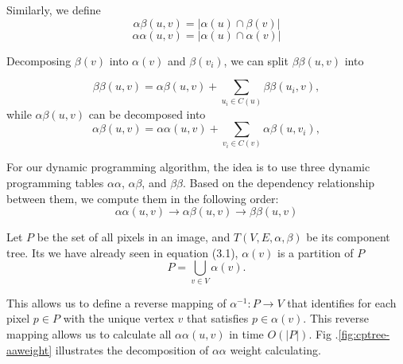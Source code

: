 Similarly, we define 
\begin{equation*} \label{eqn:alphabeta}
\alpha\beta(u,v) = |\alpha(u) \cap \beta(v)|  
\end{equation*}
\begin{equation*} \label{eqn:alphaalpha}
\alpha\alpha(u,v) = |\alpha(u)\cap\alpha(v)|
\end{equation*}

Decomposing $\beta(v)$ into $\alpha(v)$ and $\beta(v_i)$, we can split $\beta\beta(u,v)$ into

\begin{equation*} \label{eqn:betabeta-comp}
\beta\beta(u,v) = \alpha\beta(u,v) + \sum_{u_i \in C(u)}\beta\beta(u_i,v),
\end{equation*}
while $\alpha\beta(u,v)$ can be decomposed into
\begin{equation*} \label{eqn:alphabeta-comp}
\alpha\beta(u,v) = \alpha\alpha(u,v) + \sum_{v_i \in C(v)}\alpha\beta(u,v_i),
\end{equation*}

For our dynamic programming algorithm, the idea is to use three dynamic
programming tables $\alpha\alpha$, $\alpha\beta$, and $\beta\beta$. Based on the
dependency relationship between them, we compute them in the following
order:
\begin{equation*}
\alpha\alpha(u,v) \to \alpha\beta(u,v) \to \beta\beta(u,v)  
\end{equation*}

Let $P$ be the set of all pixels in an image, and $T(V,E,\alpha,\beta)$
be its component tree. Its we have already seen in equation (3.1), $\alpha(v)$ is a partition of $P$
\begin{equation} \label{eqn:alpha-decompose}
P = \bigcup_{v \in V}\alpha(v).
\end{equation}

This allows us to define a reverse mapping of $\alpha^{-1}: P \to V$ that
identifies for each pixel $p\in P$ with the unique vertex $v$ that satisfies 
$p\in\alpha(v)$.  This reverse mapping allows us to calculate all
$\alpha\alpha(u,v)$ in time $O(|P|)$. Fig .\ref{fig:cptree-aaweight} illustrates
the decomposition of $\alpha\alpha$ weight calculating.

